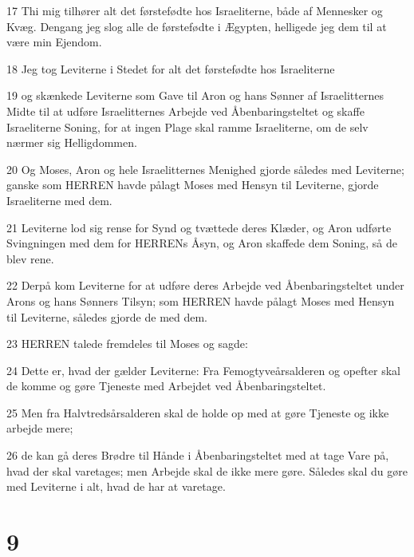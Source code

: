 \par 17 Thi mig tilhører alt det førstefødte hos Israeliterne, både af Mennesker og Kvæg. Dengang jeg slog alle de førstefødte i Ægypten, helligede jeg dem til at være min Ejendom.
\par 18 Jeg tog Leviterne i Stedet for alt det førstefødte hos Israeliterne
\par 19 og skænkede Leviterne som Gave til Aron og hans Sønner af Israelitternes Midte til at udføre Israelitternes Arbejde ved Åbenbaringsteltet og skaffe Israeliterne Soning, for at ingen Plage skal ramme Israeliterne, om de selv nærmer sig Helligdommen.
\par 20 Og Moses, Aron og hele Israelitternes Menighed gjorde således med Leviterne; ganske som HERREN havde pålagt Moses med Hensyn til Leviterne, gjorde Israeliterne med dem.
\par 21 Leviterne lod sig rense for Synd og tvættede deres Klæder, og Aron udførte Svingningen med dem for HERRENs Åsyn, og Aron skaffede dem Soning, så de blev rene.
\par 22 Derpå kom Leviterne for at udføre deres Arbejde ved Åbenbaringsteltet under Arons og hans Sønners Tilsyn; som HERREN havde pålagt Moses med Hensyn til Leviterne, således gjorde de med dem.
\par 23 HERREN talede fremdeles til Moses og sagde:
\par 24 Dette er, hvad der gælder Leviterne: Fra Femogtyveårsalderen og opefter skal de komme og gøre Tjeneste med Arbejdet ved Åbenbaringsteltet.
\par 25 Men fra Halvtredsårsalderen skal de holde op med at gøre Tjeneste og ikke arbejde mere;
\par 26 de kan gå deres Brødre til Hånde i Åbenbaringsteltet med at tage Vare på, hvad der skal varetages; men Arbejde skal de ikke mere gøre. Således skal du gøre med Leviterne i alt, hvad de har at varetage.

\chapter{9}

